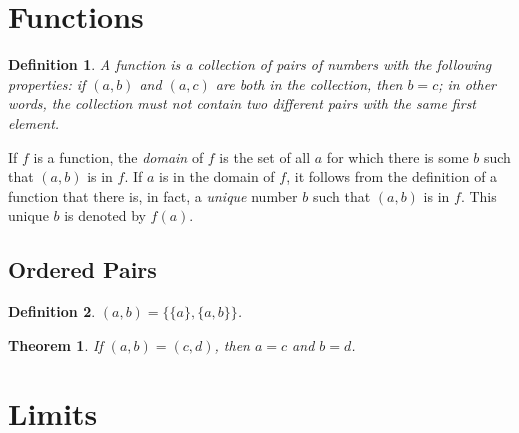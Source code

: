 \documentclass{article}
\numberwithin{definition}{subsection}
\newtheorem*{definition*}{Definition}
\numberwithin{lemma}{subsection}
\newtheorem{theorem}{Theorem}
\numberwithin{theorem}{subsection}
\begin{document}
\setcounter{section}{2}
\section{Functions}

\begin{definition*}
  A \emph{function} is a collection of pairs of numbers with the following
  properties: if $(a, b)$ and $(a, c)$ are both in the collection, then $b =
  c$; in other words, the collection must not contain two different pairs with
  the same first element.
\end{definition*}

If $f$ is a function, the \emph{domain} of $f$ is the set of all $a$ for which
there is some $b$ such that $(a, b)$ is in $f$. If $a$ is in the domain of $f$,
it follows from the definition of a function that there is, in fact, a
\emph{unique} number $b$ such that $(a, b)$ is in $f$. This unique $b$ is
denoted by $f(a)$.

\subsection{Ordered Pairs}

\begin{definition*}
  $(a, b) = \{\{a\}, \{a, b\}\}$.
\end{definition*}

\begin{theorem}
  If $(a, b) = (c, d)$, then $a = c$ and $b = d$.
\end{theorem}

\setcounter{section}{4}
\section{Limits}
\end{document}
